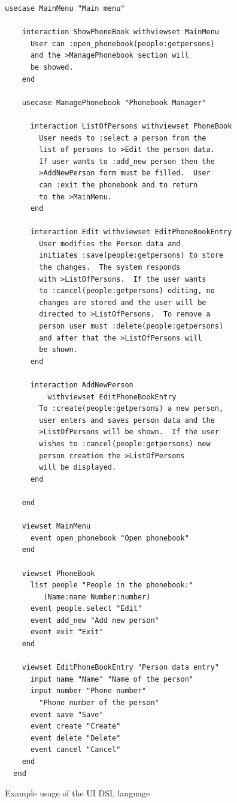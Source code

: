 \documentclass[conference]{IEEEtran}
\begin{document}
\begin{figure}
  \begin{lstlisting}[language=ViewsetDSL]
  usecase MainMenu "Main menu"

    interaction ShowPhoneBook withviewset MainMenu
      User can :open_phonebook(people:getpersons)
      and the >ManagePhonebook section will
      be showed.
    end

    usecase ManagePhonebook "Phonebook Manager"

      interaction ListOfPersons withviewset PhoneBook
        User needs to :select a person from the
        list of persons to >Edit the person data.
        If user wants to :add_new person then the
        >AddNewPerson form must be filled.  User
        can :exit the phonebook and to return
        to the >MainMenu.
      end

      interaction Edit withviewset EditPhoneBookEntry 
        User modifies the Person data and
        initiates :save(people:getpersons) to store
        the changes.  The system responds
        with >ListOfPersons.  If the user wants
        to :cancel(people:getpersons) editing, no
        changes are stored and the user will be
        directed to >ListOfPersons.  To remove a
        person user must :delete(people:getpersons)
        and after that the >ListOfPersons will
        be shown.
      end

      interaction AddNewPerson
          withviewset EditPhoneBookEntry
        To :create(people:getpersons) a new person,
        user enters and saves person data and the
        >ListOfPersons will be shown.  If the user
        wishes to :cancel(people:getpersons) new
        person creation the >ListOfPersons
        will be displayed.
      end

    end

    viewset MainMenu
      event open_phonebook "Open phonebook"
    end

    viewset PhoneBook
      list people "People in the phonebook:"
         (Name:name Number:number)
      event people.select "Edit"
      event add_new "Add new person"
      event exit "Exit"
    end

    viewset EditPhoneBookEntry "Person data entry"
      input name "Name" "Name of the person"
      input number "Phone number"
        "Phone number of the person"
      event save "Save"
      event create "Create"
      event delete "Delete"
      event cancel "Cancel"
    end
  end
  \end{lstlisting}
  \caption{Example usage of the UI DSL language}
  \label{fig:example_usage}
\end{figure}
\end{document}
